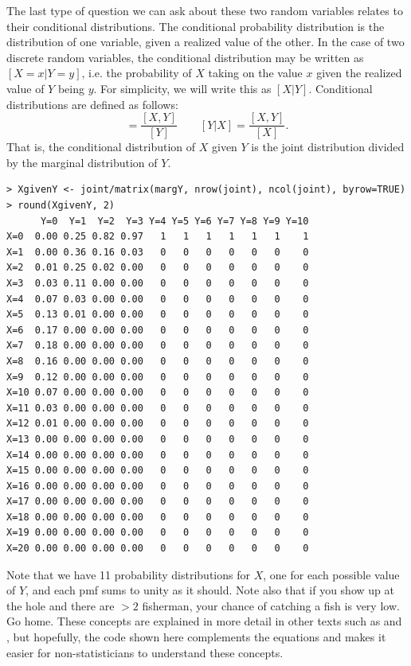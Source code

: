 The last type of question we can ask about these two random variables
relates to their conditional distributions. The
conditional probability distribution is the distribution of one
variable, given a realized value of the other. In the case of two discrete random
variables, the conditional distribution may be written as
$[X=x|Y=y]$, i.e. the probability of $X$ taking on the value $x$
given the realized value of $Y$ being $y$. For simplicity, we will
write this as $[X|Y]$. Conditional distributions are defined as follows:
\begin{equation*}
  [X|Y] = \frac{[X,Y]}{[Y]} \qquad [Y|X] = \frac{[X,Y]}{[X]}.
\end{equation*}
That is, the conditional distribution of $X$ given $Y$ is the joint
distribution divided by the marginal distribution of $Y$.
\begin{verbatim}
> XgivenY <- joint/matrix(margY, nrow(joint), ncol(joint), byrow=TRUE)
> round(XgivenY, 2)
      Y=0  Y=1  Y=2  Y=3 Y=4 Y=5 Y=6 Y=7 Y=8 Y=9 Y=10
X=0  0.00 0.25 0.82 0.97   1   1   1   1   1   1    1
X=1  0.00 0.36 0.16 0.03   0   0   0   0   0   0    0
X=2  0.01 0.25 0.02 0.00   0   0   0   0   0   0    0
X=3  0.03 0.11 0.00 0.00   0   0   0   0   0   0    0
X=4  0.07 0.03 0.00 0.00   0   0   0   0   0   0    0
X=5  0.13 0.01 0.00 0.00   0   0   0   0   0   0    0
X=6  0.17 0.00 0.00 0.00   0   0   0   0   0   0    0
X=7  0.18 0.00 0.00 0.00   0   0   0   0   0   0    0
X=8  0.16 0.00 0.00 0.00   0   0   0   0   0   0    0
X=9  0.12 0.00 0.00 0.00   0   0   0   0   0   0    0
X=10 0.07 0.00 0.00 0.00   0   0   0   0   0   0    0
X=11 0.03 0.00 0.00 0.00   0   0   0   0   0   0    0
X=12 0.01 0.00 0.00 0.00   0   0   0   0   0   0    0
X=13 0.00 0.00 0.00 0.00   0   0   0   0   0   0    0
X=14 0.00 0.00 0.00 0.00   0   0   0   0   0   0    0
X=15 0.00 0.00 0.00 0.00   0   0   0   0   0   0    0
X=16 0.00 0.00 0.00 0.00   0   0   0   0   0   0    0
X=17 0.00 0.00 0.00 0.00   0   0   0   0   0   0    0
X=18 0.00 0.00 0.00 0.00   0   0   0   0   0   0    0
X=19 0.00 0.00 0.00 0.00   0   0   0   0   0   0    0
X=20 0.00 0.00 0.00 0.00   0   0   0   0   0   0    0
\end{verbatim}
Note that we have 11 probability distributions for $X$, one for each
possible value of $Y$, and each pmf sums to unity as it should. Note
also that if you show up at the hole and there are $>2$
fisherman, your chance of catching a fish is very low. Go home.
These concepts are explained in more detail %
in other texts such as \citet{casella_berger:2002} and \citet{link_barker:2010}, but hopefully, the
code shown here complements the equations and makes it easier for
non-statisticians to understand these concepts.

